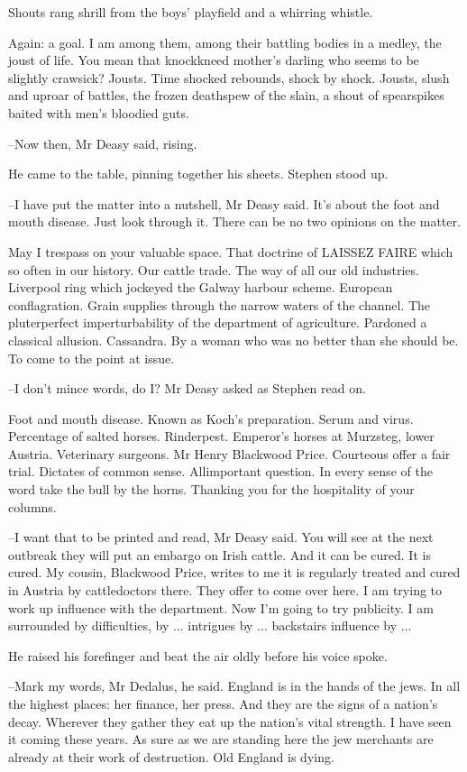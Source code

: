 Shouts rang shrill from the boys' playfield and a whirring whistle.

Again: a goal. I am among them, among their battling bodies in a
medley, the joust of life. You mean that knockkneed mother's darling who
seems to be slightly crawsick? Jousts. Time shocked rebounds, shock by
shock. Jousts, slush and uproar of battles, the frozen deathspew of the
slain, a shout of spearspikes baited with men's bloodied guts.

--Now then, Mr Deasy said, rising.

He came to the table, pinning together his sheets. Stephen stood up.

--I have put the matter into a nutshell, Mr Deasy said. It's about the
foot and mouth disease. Just look through it. There can be no two opinions
on the matter.

May I trespass on your valuable space. That doctrine of LAISSEZ FAIRE
which so often in our history. Our cattle trade. The way of all our old
industries. Liverpool ring which jockeyed the Galway harbour scheme.
European conflagration. Grain supplies through the narrow waters of the
channel. The pluterperfect imperturbability of the department of
agriculture. Pardoned a classical allusion. Cassandra. By a woman who
was no better than she should be. To come to the point at issue.

--I don't mince words, do I? Mr Deasy asked as Stephen read on.

Foot and mouth disease. Known as Koch's preparation. Serum and
virus. Percentage of salted horses. Rinderpest. Emperor's horses at
Murzsteg, lower Austria. Veterinary surgeons. Mr Henry Blackwood Price.
Courteous offer a fair trial. Dictates of common sense. Allimportant
question. In every sense of the word take the bull by the horns. Thanking
you for the hospitality of your columns.

--I want that to be printed and read, Mr Deasy said. You will see at the
next outbreak they will put an embargo on Irish cattle. And it can be
cured. It is cured. My cousin, Blackwood Price, writes to me it is
regularly treated and cured in Austria by cattledoctors there. They offer
to come over here. I am trying to work up influence with the department.
Now I'm going to try publicity. I am surrounded by difficulties,
by ... intrigues by ... backstairs influence by ...

He raised his forefinger and beat the air oldly before his voice spoke.

--Mark my words, Mr Dedalus, he said. England is in the hands of the
jews. In all the highest places: her finance, her press. And they are the
signs of a nation's decay. Wherever they gather they eat up the nation's
vital strength. I have seen it coming these years. As sure as we are
standing here the jew merchants are already at their work of destruction.
Old England is dying.

